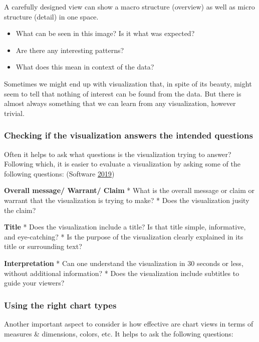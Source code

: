 \documentclass[]{book}
\providecommand{\tightlist}{%
  \setlength{\itemsep}{0pt}\setlength{\parskip}{0pt}}
\begin{document}
A carefully designed view can show a macro structure (overview) as well as micro structure (detail) in one space.

\begin{itemize}
\tightlist
\item
  What can be seen in this image? Is it what was expected?
\item
  Are there any interesting patterns?
\item
  What does this mean in context of the data?
\end{itemize}

Sometimes we might end up with visualization that, in spite of its beauty, might seem to tell that nothing of interest can be found from the data. But there is almost always something that we can learn from any visualization, however trivial.

\hypertarget{checking-if-the-visualization-answers-the-intended-questions}{%
\subsubsection{Checking if the visualization answers the intended questions}\label{checking-if-the-visualization-answers-the-intended-questions}}

Often it helps to ask what questions is the visualization trying to answer? Following which, it is easier to evaluate a visualization by asking some of the following questions: (Software \protect\hyperlink{ref-analyze_viz}{2019})

\textbf{Overall message/ Warrant/ Claim}
* What is the overall message or claim or warrant that the visualization is trying to make?
* Does the visualization jusity the claim?

\textbf{Title}
* Does the visualization include a title? Is that title simple, informative, and eye-catching?
* Is the purpose of the visualization clearly explained in its title or surrounding text?

\textbf{Interpretation}
* Can one understand the visualization in 30 seconds or less, without additional information?
* Does the visualization include subtitles to guide your viewers?

\hypertarget{using-the-right-chart-types}{%
\subsubsection{Using the right chart types}\label{using-the-right-chart-types}}

Another important aspect to consider is how effective are chart views in terms of measures \& dimensions, colors, etc. It helps to ask the following questions:
\end{document}
